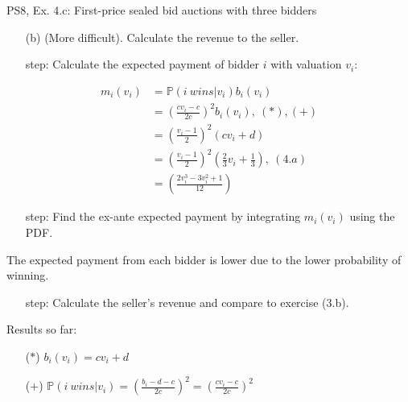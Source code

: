 \begin{frame}{PS8, Ex. 4.c: First-price sealed bid auctions with three bidders}
    \begin{itemize}
      \item[(b)] (More difficult). Calculate the revenue to the seller.
    \end{itemize}
    \vspace{-8pt}
    \begin{multicols}{2}
      \begin{itemize}
        \item[\nth{1} step:] Calculate the expected payment of bidder $i$ with valuation $v_i$:
      \end{itemize}
      \vspace{-14pt}
      \begin{align*}
        m_i(v_i)&=\mathbb{P}(i\ wins|v_i)b_i(v_i)\\
                &=\left(\frac{cv_i-c}{2c}\right)^2b_i(v_i),\ (*),(+)\\
                &=\left(\frac{v_i-1}{2}\right)^2(cv_i+d)\\
                &=\left(\frac{v_i-1}{2}\right)^2\left(\frac{2}{3}v_i+\frac{1}{3}\right),\ (4.a)\\
                &=\left(\frac{2v_i^3-3v_i^2+1}{12}\right)
      \end{align*}
      \vspace{-14pt}
      \begin{itemize}
        \item[\nth{2} step:] Find the ex-ante expected payment by integrating $m_i(v_i)$ using the PDF.
      \end{itemize}
      \vspace{-6pt}
      The expected payment from each bidder is lower due to the lower probability of winning.
      \vspace{-6pt}
      \begin{itemize}
        \item[\nth{3} step:] Calculate the seller's revenue and compare to exercise (3.b).
      \end{itemize}
      \vfill\null\columnbreak
      Results so far:
      \vspace{-6pt}
      \begin{itemize}
        \item[($*$)] $b_i(v_i) = cv_i+d$
        \item[($+$)] $\mathbb{P}(i\ wins|v_i)=\left(\frac{b_i-d-c}{2c}\right)^2=\left(\frac{cv_i-c}{2c}\right)^2$

\end{itemize}
\end{multicols}
\end{frame}
